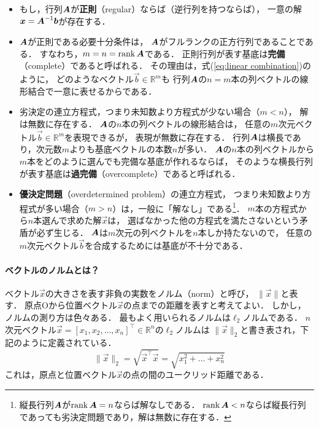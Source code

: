 \begin{itemize}
\item
もし，行列$\mbox{\boldmath $A$}$が{\bf 正則}（regular）ならば（逆行列を持つならば），
一意の解$\mbox{\boldmath $x$}=\mbox{\boldmath $A$}^{-1}\mbox{\boldmath $b$}$が存在する．
\item
$\mbox{\boldmath $A$}$が正則である必要十分条件は，
$\mbox{\boldmath $A$}$がフルランクの正方行列であることである．
すなわち，$m=n=\mathop{\textrm{rank}}\nolimits\mbox{\boldmath $A$}$である．
正則行列が表す基底は{\bf 完備}（complete）であると呼ばれる．
その理由は，式(\ref{eq:linear combination})のように，
どのようなベクトル$\vec b\in\mathbb{R}^m$も
行列$\mbox{\boldmath $A$}$の$n=m$本の列ベクトルの線形結合で一意に表せるからである．
\item
劣決定の連立方程式，つまり未知数より方程式が少ない場合（$m<n$），
解は無数に存在する．
$\mbox{\boldmath $A$}$の$n$本の列ベクトルの線形結合は，
任意の$m$次元ベクトル$\vec b\in\mathbb{R}^m$を表現できるが，
表現が無数に存在する．
行列$\mbox{\boldmath $A$}$は横長であり，次元数$m$よりも基底ベクトルの本数$n$が多い．
$\mbox{\boldmath $A$}$の$n$本の列ベクトルから$m$本をどのように選んでも完備な基底が作れるならば，
そのような横長行列が表す基底は{\bf 過完備}（overcomplete）であると呼ばれる．
\item
{\bf 優決定問題}（overdetermined problem）の連立方程式，
つまり未知数より方程式が多い場合（$m>n$）は，一般に「解なし」である\footnote{%
縦長行列$\mbox{\boldmath $A$}$が$\mathop{\textrm{rank}}\nolimits\mbox{\boldmath $A$}=n$ならば解なしである．
$\mathop{\textrm{rank}}\nolimits\mbox{\boldmath $A$}<n$ならば縦長行列であっても劣決定問題であり，解は無数に存在する．}．
$m$本の方程式から$n$本選んで求めた解$\vec x$は，
選ばなかった他の方程式を満たさないという矛盾が必ず生じる．
$\mbox{\boldmath $A$}$は$m$次元の列ベクトルを$n$本しか持たないので，
任意の$m$次元ベクトル$\vec b$を合成するためには基底が不十分である．

\end{itemize}


\paragraph{ベクトルのノルムとは？}

ベクトル$\vec x$の大きさを表す非負の実数をノルム（norm）と呼び，
$\|\vec x\|$と表す．
原点Oから位置ベクトル$\vec x$の点までの距離を表すと考えてよい．
しかし，ノルムの測り方は色々ある．
最もよく用いられるノルムは$\ell_2$ノルムである．
$n$次元ベクトル$\vec x=[x_1,x_2,\dots,x_n]^\top\in\mathbb{R}^n$の$\ell_2$ノルムは
$\|\vec x\|_2$と書き表され，下記のように定義されている．
\begin{equation}
\|\vec x\|_2=\sqrt{\vec x^\top\vec x}=\sqrt{x_1^2+\dots+x_n^2}
\label{eq:l2 norm}
\end{equation}
これは，原点と位置ベクトル$\vec x$の点の間のユークリッド距離である．

